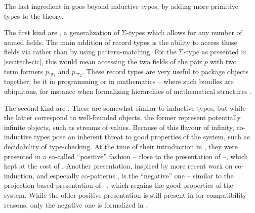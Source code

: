 The last ingredient in  goes beyond inductive types, by adding more primitive types
to the theory.

\AP The first kind are ,
a generalization of Σ-types which allows for any number of
named fields. The main addition of record types is the ability to access those fields via
 rather than by using pattern-matching. For the Σ-type as presented in
\cref{sec:tech-cic}, this would mean accessing the two fields of the pair $p$ with two
term formers $p._{\pi_{1}}$ and $p._{\pi_{2}}$. These record types are very useful to package
objects together, be it in programming or in mathematics – where such bundles are ubiquitous,
for instance when formalizing hierarchies of mathematical structures .

\AP The second kind are .
These are somewhat similar to inductive types, but
while the latter correspond to well-founded objects, the former represent
potentially infinite objects, such as streams of values. Because of this flavour of infinity,
co-inductive types pose an inherent threat to good properties of the system, such as
decidability of type-checking. At the time of their introduction in 
, they were presented in a so-called “positive” fashion – close
to the presentation of  –, which
kept  at the cost of .
Another presentation, inspired by more recent work on
co-induction, and especially co-patterns , is the “negative” one –
similar to the projection-based presentation of  –,
which regains the good properties of the system. While the older positive presentation
is still present in  for compatibility reasons,
only the negative one is formalized in .
